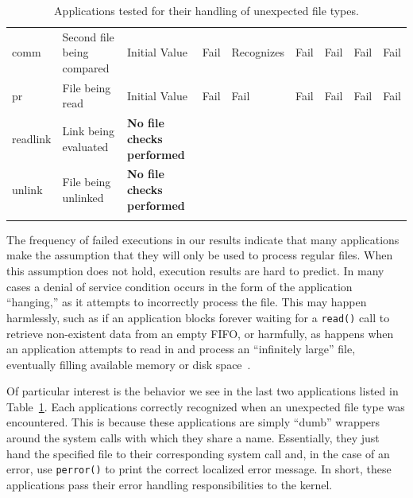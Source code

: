 \begin{table}[t]
\begin{tabular}{l  l  |  l  l  l  l  l  l  l}
        comm        & Second file being compared & Initial Value  & Fail           & Recognizes  & Fail       & Fail        & Fail       & Fail\\
        pr          & File being read            & Initial Value  & Fail           & Fail        & Fail       & Fail        & Fail       & Fail\\
\hline
        readlink    & Link being evaluated       & \textbf{No file checks performed} & & & & & & \\
        unlink      & File being unlinked        & \textbf{No file checks performed} & & & & & & \\
    \bottomrule{}
    \end{tabular}
    \caption{Applications tested for their handling of unexpected file types.}
    \label{table:unexpectedtypes}
\end{table}

The frequency of failed executions in our results indicate that many
applications make the assumption that they will only be used to process
regular files.  When this assumption does not hold, execution results 
are hard to predict.  In many cases a denial of
service condition occurs in the form of the application ``hanging,'' as it
attempts to incorrectly process the file.  This may happen harmlessly, such
as if an application blocks forever waiting for a {\tt read()}
call to retrieve non-existent data from an empty FIFO, or harmfully, as
happens when an application attempts to read in and process an
``infinitely large'' file, eventually filling available memory or disk
space~\cite{Cappos_CCS_08}.


Of particular interest is the behavior we see
in the last two applications listed in Table~\ref{table:unexpectedtypes}.  Each 
applications correctly recognized when an unexpected file type 
was encountered.  This is because these applications are simply ``dumb'' wrappers
around the system calls with which they share a name. Essentially, they just hand
the specified file to their corresponding system call and, in the case of an
error, use {\tt perror()} to print the correct localized error message.  In
short, these applications pass their error handling responsibilities to the
kernel.

